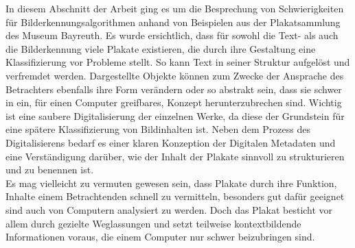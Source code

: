 \documentclass[a4paper,12pt,ngerman]{article}
\begin{document}
In diesem Abschnitt der Arbeit ging es um die Besprechung von Schwierigkeiten für Bilderkennungsalgorithmen anhand von Beispielen aus der Plakatsammlung des Museum Bayreuth. Es wurde ersichtlich, dass für sowohl die Text- als auch die Bilderkennung viele Plakate existieren, die durch ihre Gestaltung eine Klassifizierung vor Probleme stellt. So kann Text in seiner Struktur aufgelöst und verfremdet werden. Dargestellte Objekte können zum Zwecke der Ansprache des Betrachters ebenfalls ihre Form verändern oder so abstrakt sein, dass sie schwer in ein, für einen Computer greifbares, Konzept herunterzubrechen sind. Wichtig ist eine saubere Digitalisierung der einzelnen Werke, da diese der Grundstein für eine spätere Klassifizierung von Bildinhalten ist. Neben dem Prozess des Digitalisierens bedarf es einer klaren Konzeption der Digitalen Metadaten und eine Verständigung darüber, wie der Inhalt der Plakate sinnvoll zu strukturieren und zu benennen ist. \\
Es mag vielleicht zu vermuten gewesen sein, dass Plakate durch ihre Funktion, Inhalte einem Betrachtenden schnell zu vermitteln, besonders gut dafür geeignet sind auch von Computern analysiert zu werden. Doch das Plakat besticht vor allem durch gezielte Weglassungen und setzt teilweise kontextbildende Informationen voraus, die einem Computer nur schwer beizubringen sind. \\
\end{document}
